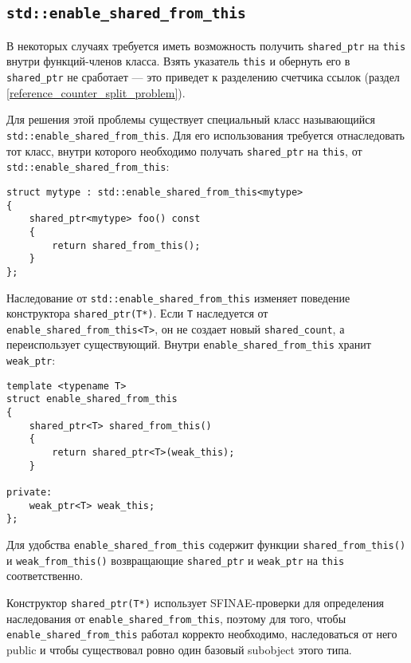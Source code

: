 \subsection{\texttt{std::enable_shared_from_this}}
\label{enable_shared_from_this}

В некоторых случаях требуется иметь возможность получить \texttt{shared_ptr} на \texttt{this} внутри функций-членов класса. Взять указатель \texttt{this} и обернуть его в \texttt{shared_ptr} не сработает --- это приведет к разделению счетчика ссылок (раздел \ref{reference_counter_split_problem}).

Для решения этой проблемы существует специальный класс называющийся \texttt{std::enable_shared_from_this}. Для его использования требуется отнаследовать тот класс, внутри которого необходимо получать \texttt{shared_ptr} на \texttt{this}, от \texttt{std::enable_shared_from_this}:

\begin{verbatim}
struct mytype : std::enable_shared_from_this<mytype>
{
    shared_ptr<mytype> foo() const
    {
        return shared_from_this();
    }
};
\end{verbatim}

Наследование от \texttt{std::enable_shared_from_this} изменяет поведение конструктора \texttt{shared_ptr(T*)}. Если \texttt{T} наследуется от \texttt{enable_shared_from_this<T>}, он не создает новый \texttt{shared_count}, а переиспользует существующий. Внутри \texttt{enable_shared_from_this} хранит \texttt{weak_ptr}:

\begin{verbatim}
template <typename T>
struct enable_shared_from_this
{
    shared_ptr<T> shared_from_this()
    {
        return shared_ptr<T>(weak_this);
    }

private:
    weak_ptr<T> weak_this;
};
\end{verbatim}

Для удобства \texttt{enable_shared_from_this} содержит функции \texttt{shared_from_this()} и \texttt{weak_from_this()} возвращающие \texttt{shared_ptr} и \texttt{weak_ptr} на \texttt{this} соответственно.

Конструктор \texttt{shared_ptr(T*)} использует SFINAE-проверки для определения наследования от \texttt{enable_shared_from_this}, поэтому для того, чтобы \texttt{enable_shared_from_this} работал корректо необходимо, наследоваться от него public и чтобы существовал ровно один базовый subobject этого типа.

